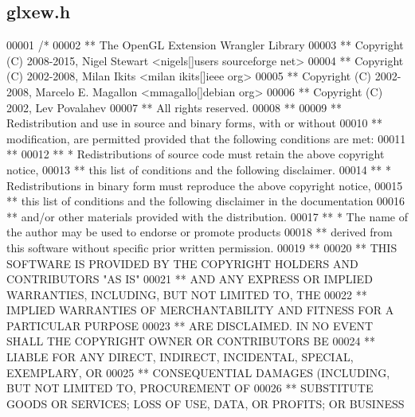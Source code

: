 \subsection{glxew.\+h}
\label{glxew_8h_source}

\begin{DoxyCode}
00001 \textcolor{comment}{/*}
00002 \textcolor{comment}{** The OpenGL Extension Wrangler Library}
00003 \textcolor{comment}{** Copyright (C) 2008-2015, Nigel Stewart <nigels[]users sourceforge net>}
00004 \textcolor{comment}{** Copyright (C) 2002-2008, Milan Ikits <milan ikits[]ieee org>}
00005 \textcolor{comment}{** Copyright (C) 2002-2008, Marcelo E. Magallon <mmagallo[]debian org>}
00006 \textcolor{comment}{** Copyright (C) 2002, Lev Povalahev}
00007 \textcolor{comment}{** All rights reserved.}
00008 \textcolor{comment}{** }
00009 \textcolor{comment}{** Redistribution and use in source and binary forms, with or without }
00010 \textcolor{comment}{** modification, are permitted provided that the following conditions are met:}
00011 \textcolor{comment}{** }
00012 \textcolor{comment}{** * Redistributions of source code must retain the above copyright notice, }
00013 \textcolor{comment}{**   this list of conditions and the following disclaimer.}
00014 \textcolor{comment}{** * Redistributions in binary form must reproduce the above copyright notice, }
00015 \textcolor{comment}{**   this list of conditions and the following disclaimer in the documentation }
00016 \textcolor{comment}{**   and/or other materials provided with the distribution.}
00017 \textcolor{comment}{** * The name of the author may be used to endorse or promote products }
00018 \textcolor{comment}{**   derived from this software without specific prior written permission.}
00019 \textcolor{comment}{**}
00020 \textcolor{comment}{** THIS SOFTWARE IS PROVIDED BY THE COPYRIGHT HOLDERS AND CONTRIBUTORS "AS IS" }
00021 \textcolor{comment}{** AND ANY EXPRESS OR IMPLIED WARRANTIES, INCLUDING, BUT NOT LIMITED TO, THE }
00022 \textcolor{comment}{** IMPLIED WARRANTIES OF MERCHANTABILITY AND FITNESS FOR A PARTICULAR PURPOSE}
00023 \textcolor{comment}{** ARE DISCLAIMED. IN NO EVENT SHALL THE COPYRIGHT OWNER OR CONTRIBUTORS BE }
00024 \textcolor{comment}{** LIABLE FOR ANY DIRECT, INDIRECT, INCIDENTAL, SPECIAL, EXEMPLARY, OR }
00025 \textcolor{comment}{** CONSEQUENTIAL DAMAGES (INCLUDING, BUT NOT LIMITED TO, PROCUREMENT OF }
00026 \textcolor{comment}{** SUBSTITUTE GOODS OR SERVICES; LOSS OF USE, DATA, OR PROFITS; OR BUSINESS}

\end{DoxyCode}
